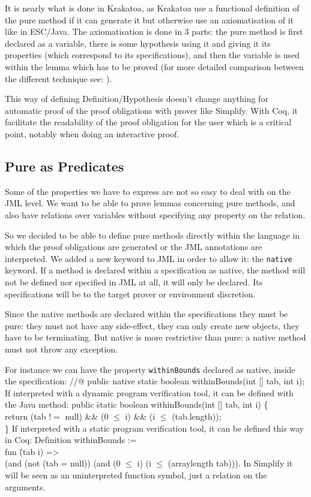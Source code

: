 It is nearly what is done in Krakatoa\cite{MPMU-04-JLAP}, as
Krakatoa use a functional definition of the pure method if it can generate it
but otherwise use an axiomatisation of it like in ESC/Java\cite{COKK-04-ESCJ}.
The axiomatisation is done in 3 parts: the pure method is first declared as a variable, 
there is some hypothesis  using it and giving it its properties (which correspond to its
specifications), and then the variable
is used within the lemma which has to be proved (for more detailed comparison between 
the different technique see: \cite{COK-04-METH, DarvasMueller-05}).

This way of defining Definition/Hypothesis doesn't change anything for automatic 
proof of the proof obligations with prover like Simplify. 
With Coq,
it facilitate the readability of the proof obligation for the user which 
is a critical point, notably when doing an interactive proof.

\subsection{Pure as Predicates}
Some of the properties we have to express are not so easy to deal with on the JML level. 
We want to be able to prove lemmas concerning pure methods, and also have 
relations over  variables without specifying any property on the relation. 

So we decided to be able to define pure methods directly within the language in which the proof 
obligations are generated or the JML annotations are interpreted. 
We added a new keyword to JML in order to allow it: the {\tt native} keyword. 
If a method is declared within a specification as native, the method will not be defined nor specified
 in JML at all, it will only be declared. Its specifications will be to the target prover or environment 
discretion.

Since the native methods are declared within the specifications they must be pure:
they must not have any side-effect, they can only
create new objects, they have to be terminating. But native is
more restrictive than pure: a native method must not throw any exception.


For instance we can have the property {\tt withinBounds} declared as native, inside the specification:
\btab
//@ public native static boolean withinBounds(int [] tab, int i); 
\etab
If interpreted with a dynamic program verification tool, it
can be defined with the Java method:
\btab
public \= static boolean withinBounds(int [] tab, int i) \{\+\\
    return (tab $!=$ null) \&\& (0 $\le$ i) \&\& (i $\le$ (tab.length));\-\\
\}
\etab
If interpreted with a static program verification tool,
it can be defined this way in Coq:
\btab
Def\=inition withinBounds := \+\\
fun \= (tab i) =>\+\\
       (and (not (tab = null)) (and (0 $\le$ i) (i $\le$ (arraylength tab))).
\etab
In Simplify it will be seen as an uninterpreted function symbol, just a relation on the arguments.

